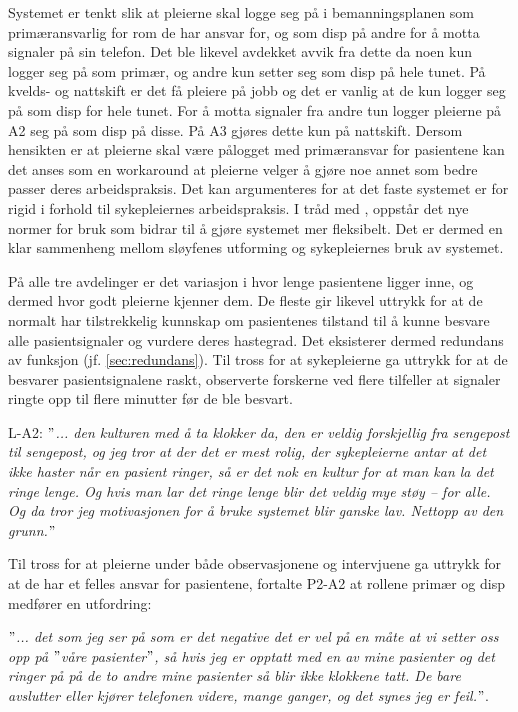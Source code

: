 \noindent
Systemet er tenkt slik at pleierne skal logge seg på i bemanningsplanen som primæransvarlig for rom de har ansvar for, og som disp på andre for å motta signaler på sin telefon. Det ble likevel avdekket avvik fra dette da noen kun logger seg på som primær, og andre kun setter seg som disp på hele tunet. På kvelds- og nattskift er det få pleiere på jobb og det er vanlig at de kun logger seg på som disp for hele tunet. For å motta signaler fra andre tun logger pleierne på A2 seg på som disp på disse. På A3 gjøres dette kun på nattskift. Dersom hensikten er at pleierne skal være pålogget med primæransvar for pasientene kan det anses som en workaround at pleierne velger å gjøre noe annet som bedre passer deres arbeidspraksis. Det kan argumenteres for at det faste systemet er for rigid i forhold til sykepleiernes arbeidspraksis. I tråd med \citep{Ackerman00}, oppstår det nye normer for bruk som bidrar til å gjøre systemet mer fleksibelt. Det er dermed en klar sammenheng mellom sløyfenes utforming og sykepleiernes bruk av systemet.

\noindent
På alle tre avdelinger er det variasjon i hvor lenge pasientene ligger inne, og dermed hvor godt pleierne kjenner dem. De fleste gir likevel uttrykk for at de normalt har tilstrekkelig kunnskap om pasientenes tilstand til å kunne besvare alle pasientsignaler og vurdere deres hastegrad. Det eksisterer dermed redundans av funksjon (jf. \ref{sec:redundans}). Til tross for at sykepleierne ga uttrykk for at de besvarer pasientsignalene raskt, observerte forskerne ved flere tilfeller at signaler ringte opp til flere minutter før de ble besvart.

\noindent
L-A2: \textit{$"$... den kulturen med å ta klokker da, den er veldig forskjellig fra sengepost til sengepost, og jeg tror at der det er mest rolig, der sykepleierne antar at det ikke haster når en pasient ringer, så er det nok en kultur for at man kan la det ringe lenge. Og hvis man lar det ringe lenge blir det veldig mye støy – for alle. Og da tror jeg motivasjonen for å bruke systemet blir ganske lav. Nettopp av den grunn.$"$}

\noindent
Til tross for at pleierne under både observasjonene og intervjuene ga uttrykk for at de har et felles ansvar for pasientene, fortalte P2-A2 at rollene primær og disp medfører en utfordring:

\noindent
\textit{$"$... det som jeg ser på som er det negative det er vel på en måte at vi setter oss opp på $"$våre pasienter$"$, så hvis jeg er opptatt med en av mine pasienter og det ringer på på de to andre mine pasienter så blir ikke klokkene tatt. De bare avslutter eller kjører telefonen videre, mange ganger, og det synes jeg er feil.$"$}.  
  
